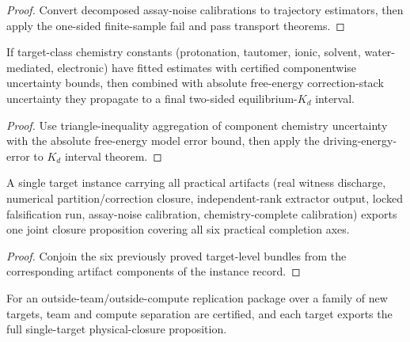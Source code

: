 \begin{proof}
Convert decomposed assay-noise calibrations to trajectory estimators, then apply the one-sided finite-sample fail and pass transport theorems.
\end{proof}

\begin{theorem}\label{thm:target-class-chemistry-completeness-kd-interval-bundle}
If target-class chemistry constants (protonation, tautomer, ionic, solvent, water-mediated, electronic) have fitted estimates with certified componentwise uncertainty bounds, then combined with absolute free-energy correction-stack uncertainty they propagate to a final two-sided equilibrium-$K_d$ interval.
\end{theorem}

\begin{proof}
Use triangle-inequality aggregation of component chemistry uncertainty with the absolute free-energy model error bound, then apply the driving-energy-error to $K_d$ interval theorem.
\end{proof}

\begin{theorem}\label{thm:single-target-full-physical-closure-instance-bundle}
A single target instance carrying all practical artifacts (real witness discharge, numerical partition/correction closure, independent-rank extractor output, locked falsification run, assay-noise calibration, chemistry-complete calibration) exports one joint closure proposition covering all six practical completion axes.
\end{theorem}

\begin{proof}
Conjoin the six previously proved target-level bundles from the corresponding artifact components of the instance record.
\end{proof}

\begin{theorem}\label{thm:external-replication-at-scale-full-pipeline-bundle}
For an outside-team/outside-compute replication package over a family of new targets, team and compute separation are certified, and each target exports the full single-target physical-closure proposition.
\end{theorem}

